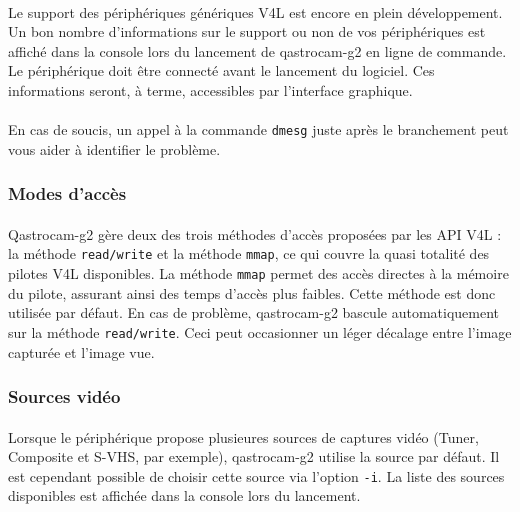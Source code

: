 \documentclass[11pt,a4paper]{book}
\begin{document}
\paragraph*{}
Le support des p\'eriph\'eriques g\'en\'eriques V4L est encore en plein d\'eveloppement. Un
bon nombre d'informations sur le support ou non de vos p\'eriph\'eriques est affich\'e dans
la console lors du lancement de qastrocam-g2 en ligne de commande. Le p\'eriph\'erique doit
 \^etre  connect\'e avant le lancement du logiciel. Ces informations seront, \`a terme, 
 accessibles par l'interface graphique.

\paragraph*{} 
En cas de soucis, un  appel \`a la commande
 {\tt dmesg} juste apr\`es le branchement peut vous aider \`a identifier le probl\`eme. 

\subsubsection{Modes d'acc\`es}

\paragraph*{}
Qastrocam-g2 g\`ere deux des trois m\'ethodes d'acc\`es propos\'ees par les API V4L : la m\'ethode
{\tt read/write} et la m\'ethode {\tt mmap}, ce qui couvre la quasi totalit\'e des pilotes V4L
disponibles. La m\'ethode {\tt mmap} permet des acc\`es directes \`a la m\'emoire du pilote,
assurant ainsi des temps d'acc\`es plus faibles. Cette m\'ethode est donc utilis\'ee par d\'efaut.
En cas de probl\`eme, qastrocam-g2 bascule automatiquement sur la m\'ethode {\tt read/write}. Ceci
peut occasionner un l\'eger d\'ecalage entre l'image captur\'ee et l'image vue. 

\subsubsection{Sources vid\'eo}

\paragraph*{}
Lorsque le p\'eriph\'erique propose plusieures sources de captures vid\'eo (Tuner, Composite et
S-VHS, par exemple), qastrocam-g2 utilise la source par d\'efaut. Il est cependant possible de
choisir cette source via l'option {\tt -i}. La liste des sources disponibles est affich\'ee dans
la console lors du lancement.
\end{document}
